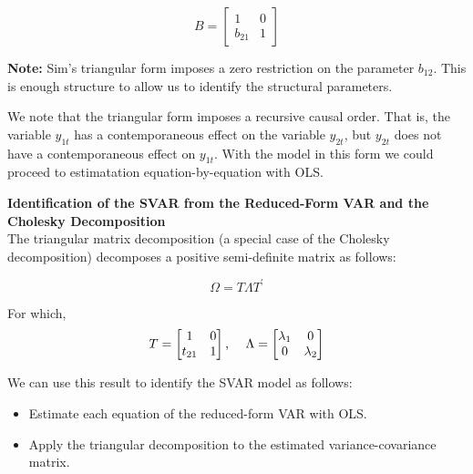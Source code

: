 \documentclass[11pt]{article}
\begin{document}
\begin{equation*}
B = \begin{bmatrix} 1 & 0 \\ b_{21} & 1 \end{bmatrix}
\end{equation*}

\vspace{3.5mm}
\textbf{Note:} Sim's triangular form imposes a zero restriction on the parameter $b_{12}$. This is enough 
structure to allow us to identify the structural parameters.

\vspace{5mm}
We note that the triangular form imposes a recursive causal order.  That is, the variable $y_{1t}$ has a contemporaneous
effect on the variable $y_{2t}$, but $y_{2t}$ does not have a contemporaneous effect on $y_{1t}$. With the model in this
form we could proceed to estimatation equation-by-equation with OLS.

\vspace{10mm}
\textbf{Identification of the SVAR from the Reduced-Form VAR and the Cholesky Decomposition} \\

\vspace{3.5mm}
The triangular matrix decomposition (a special case of the Cholesky decomposition) decomposes a 
positive semi-definite matrix as follows:\

\begin{equation*}
\Omega = T \Lambda T^{\prime}
\end{equation*}

\vspace{3.5mm}
For which, 
\begin{equation*}
T = \begin{bmatrix} 1 & 0 \\ t_{21} & 1 \end{bmatrix} \mbox{, \quad} \Lambda = \begin{bmatrix} \lambda_{1} & 0 \\ 0 & \lambda_{2} \end{bmatrix}
\end{equation*}

\vspace{3.5mm}
We can use this result to identify the SVAR model as follows:

\begin{itemize}
 \item Estimate each equation of the reduced-form VAR with OLS.
 \item Apply the triangular decomposition to the estimated variance-covariance matrix.
\end{itemize}
\end{document}
